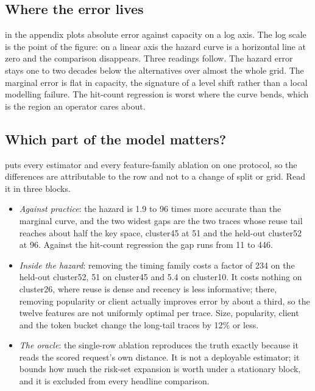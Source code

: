 \subsection{Where the error lives}
\label{sec:error}

 in the appendix plots absolute error against capacity on a
log axis. The log scale is the point of the figure: on a linear axis the hazard curve is a
horizontal line at zero and the comparison disappears. Three readings follow. The
hazard error stays one to two decades below the alternatives over almost the whole
grid. The marginal error is flat in capacity, the signature of a level shift rather
than a local modelling failure. The hit-count regression is worst where the curve
bends, which is the region an operator cares about.

\subsection{Which part of the model matters?}
\label{sec:ablation}

 puts every estimator and every feature-family ablation on one
protocol, so the differences are attributable to the row and not to a change of
split or grid. Read it in three blocks.

\begin{itemize}[leftmargin=1.2em,itemsep=2pt]
  \item \emph{Against practice}: the hazard is 1.9 to 96 times more accurate than
  the marginal curve, and the two widest gaps are the two traces whose reuse tail
  reaches about half the key space, cluster45 at 51 and the held-out cluster52 at 96.
  Against the hit-count regression the gap runs from 11 to 446.
  \item \emph{Inside the hazard}: removing the timing family costs a factor of 234 on
  the held-out cluster52, 51 on cluster45 and 5.4 on cluster10. It costs nothing on
  cluster26, where reuse is dense and recency is less informative; there, removing
  popularity or client actually improves error by about a third, so the twelve
  features are not uniformly optimal per trace. Size, popularity, client and the
  token bucket change the long-tail traces by 12\% or less.
  \item \emph{The oracle}: the single-row ablation reproduces the truth exactly
  because it reads the scored request's own distance. It is not a deployable
  estimator; it bounds how much the risk-set expansion is worth under a stationary
  block, and it is excluded from every headline comparison.
\end{itemize}

